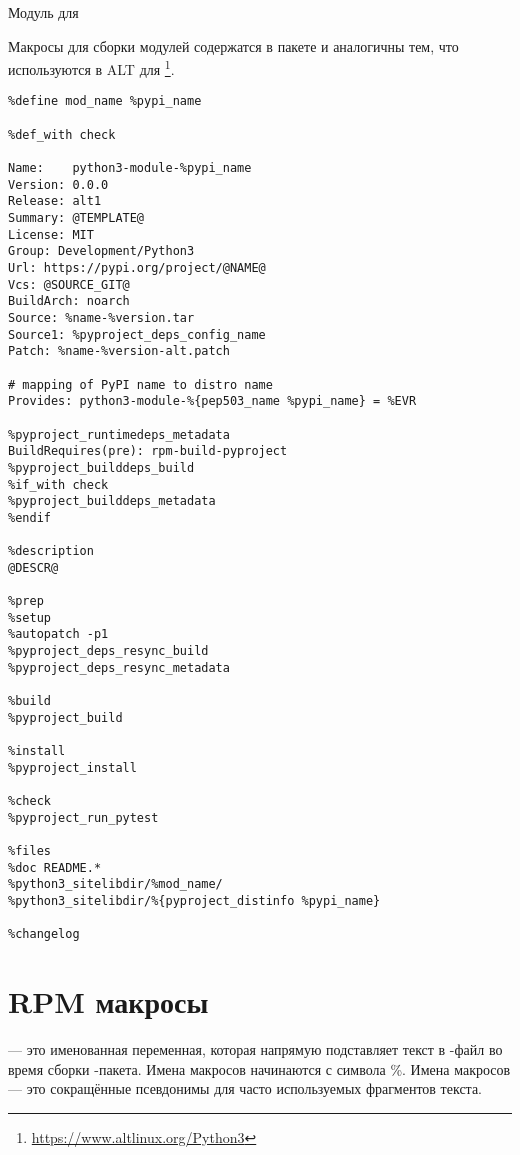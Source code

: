  Модуль для 
	
	Макросы для сборки модулей  содержатся в пакете  и
	аналогичны тем, что используются в ALT для \footnote{\href{https://www.altlinux.org/Python3}{https://www.altlinux.org/Python3}}.
\begin{Verbatim}[breaklines=true,breakanywhere=true,fontsize=\scriptsize]
%define pypi_name @NAME@
%define mod_name %pypi_name
		
%def_with check
		
Name:    python3-module-%pypi_name
Version: 0.0.0
Release: alt1
Summary: @TEMPLATE@
License: MIT
Group: Development/Python3
Url: https://pypi.org/project/@NAME@
Vcs: @SOURCE_GIT@
BuildArch: noarch
Source: %name-%version.tar
Source1: %pyproject_deps_config_name
Patch: %name-%version-alt.patch
		
# mapping of PyPI name to distro name
Provides: python3-module-%{pep503_name %pypi_name} = %EVR
		
%pyproject_runtimedeps_metadata
BuildRequires(pre): rpm-build-pyproject
%pyproject_builddeps_build
%if_with check
%pyproject_builddeps_metadata
%endif
		
%description
@DESCR@
	
%prep
%setup
%autopatch -p1
%pyproject_deps_resync_build
%pyproject_deps_resync_metadata
		
%build
%pyproject_build
		
%install
%pyproject_install
		
%check
%pyproject_run_pytest
		
%files
%doc README.*
%python3_sitelibdir/%mod_name/
%python3_sitelibdir/%{pyproject_distinfo %pypi_name}
		
%changelog
\end{Verbatim}

\section{RPM макросы}
 --- это именованная переменная, которая напрямую подставляет текст в -файл
во время сборки -пакета. Имена макросов начинаются с символа \%. Имена макросов --- это
сокращённые псевдонимы для часто используемых фрагментов текста.
	
